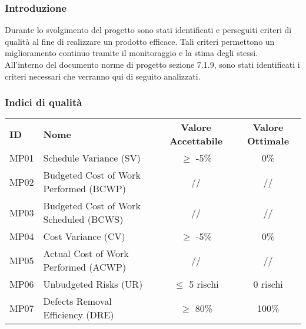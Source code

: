 

\subsubsection{Introduzione}
Durante lo svolgimento del progetto sono stati identificati e perseguiti criteri di qualità al fine di realizzare un prodotto efficace. Tali criteri permettono un miglioramento continuo tramite il monitoraggio e la stima degli stessi.\\
All'interno del documento norme di progetto sezione 7.1.9, sono stati identificati i criteri necessari che verranno qui di seguito analizzati.
\subsubsection{Indici di qualità}

\begin{table} [h!]
	\begin{center}
		\begin{tabular} {m{2 cm} m{7 cm} c c }
			\rowcolor{lightgray}
			\textbf{ID} & \textbf{Nome}& \textbf{Valore Accettabile} & \textbf{Valore Ottimale}\\
			MP01 & Schedule Variance (SV)   & $\geq$ -5\%    & 0\% \\
			MP02 & Budgeted Cost of Work Performed (BCWP) & //           & // \\
			MP03 & Budgeted Cost of Work Scheduled (BCWS) & //           & // \\
			MP04 & Cost Variance (CV)   & $\geq$ -5\% & 0\% \\
			MP05 & Actual Cost of Work Performed (ACWP) & //           & // \\
			MP06 & Unbudgeted Risks (UR)   & $\leq$ 5 rischi & 0 rischi\\
			MP07 & Defects Removal Efficiency (DRE)  & $\geq$  80\% & 100\%\\

		\end{tabular}
	\end{center}
\end{table}





